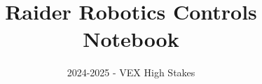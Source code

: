 \documentclass{engineeringNotebook}
\title{Raider Robotics Controls Notebook}
\subtitle{2024-2025 - VEX High Stakes}
\begin{document}
\maketitle
\graphicspath{{images/}{../images/}}
\newpage
\tableofcontents
\newpage


\newpage

% 
\end{document}
